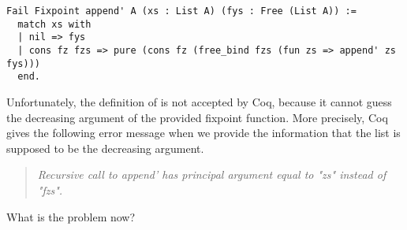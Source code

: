 \begin{verbatim}
Fail Fixpoint append' A (xs : List A) (fys : Free (List A)) :=
  match xs with
  | nil => fys
  | cons fz fzs => pure (cons fz (free_bind fzs (fun zs => append' zs fys)))
  end.
\end{verbatim}

Unfortunately, the definition of  is not accepted by
Coq, because it cannot guess the decreasing argument of the provided
fixpoint function.
More precisely, Coq gives the following error message when we
provide the information that the list  is supposed to be the
decreasing argument.

\begin{quote}
\emph{Recursive call to append' has principal argument equal to "zs" instead of
"fzs".}
\end{quote}

What is the problem now?

